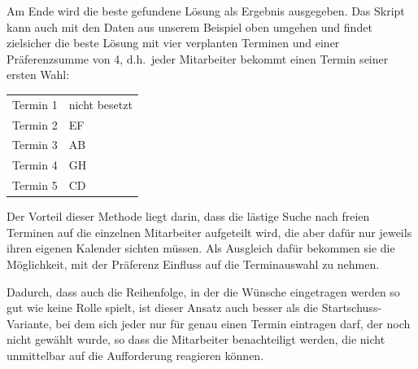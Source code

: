 Am Ende wird die beste gefundene Lösung als Ergebnis ausgegeben. Das Skript kann auch mit den Daten aus unserem Beispiel oben umgehen und findet zielsicher die beste Lösung mit vier verplanten Terminen und einer Präferenzsumme von 4, d.h.\ jeder Mitarbeiter bekommt einen Termin seiner ersten Wahl:

\begin{center}
\begin{tabular}{|c|l|}\hline
Termin 1& nicht besetzt\\
Termin 2& EF\\
Termin 3& AB\\
Termin 4& GH\\
Termin 5& CD\\ \hline
\end{tabular}
\end{center}

Der Vorteil dieser Methode liegt darin, dass die lästige Suche nach freien Terminen auf die einzelnen Mitarbeiter aufgeteilt wird, die aber dafür nur jeweils ihren eigenen Kalender sichten müssen. Als Ausgleich dafür bekommen sie die Möglichkeit, mit der Präferenz Einfluss auf die Terminauswahl zu nehmen.

Dadurch, dass auch die Reihenfolge, in der die Wünsche eingetragen werden so gut wie keine Rolle spielt, ist dieser Ansatz auch besser als die Startschuss-Variante, bei dem sich jeder nur für genau einen Termin eintragen darf, der noch nicht gewählt wurde, so dass die Mitarbeiter benachteiligt werden, die nicht unmittelbar auf die Aufforderung reagieren können.

